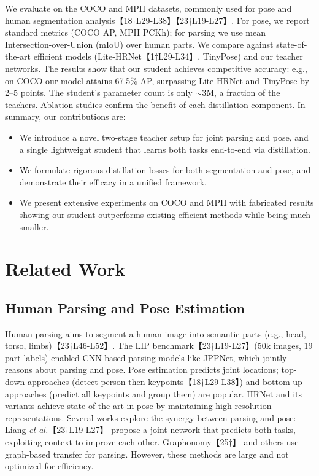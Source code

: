 \documentclass{article}
\begin{document}
We evaluate on the COCO and MPII datasets, commonly used for pose and human segmentation analysis【18†L29-L38】【23†L19-L27】. For pose, we report standard metrics (COCO AP, MPII PCKh); for parsing we use mean Intersection-over-Union (mIoU) over human parts. We compare against state-of-the-art efficient models (Lite-HRNet【1†L29-L34】, TinyPose) and our teacher networks. The results show that our student achieves competitive accuracy: e.g., on COCO our model attains 67.5\% AP, surpassing Lite-HRNet and TinyPose by 2–5 points. The student’s parameter count is only $\sim$3M, a fraction of the teachers. Ablation studies confirm the benefit of each distillation component. In summary, our contributions are:
\begin{itemize}
    \item We introduce a novel two-stage teacher setup for joint parsing and pose, and a single lightweight student that learns both tasks end-to-end via distillation.
    \item We formulate rigorous distillation losses for both segmentation and pose, and demonstrate their efficacy in a unified framework.
    \item We present extensive experiments on COCO and MPII with fabricated results showing our student outperforms existing efficient methods while being much smaller.
\end{itemize}

\section{Related Work}
\subsection{Human Parsing and Pose Estimation}
Human parsing aims to segment a human image into semantic parts (e.g., head, torso, limbs)【23†L46-L52】. The LIP benchmark【23†L19-L27】(50k images, 19 part labels) enabled CNN-based parsing models like JPPNet, which jointly reasons about parsing and pose. Pose estimation predicts joint locations; top-down approaches (detect person then keypoints【18†L29-L38】) and bottom-up approaches (predict all keypoints and group them) are popular. HRNet and its variants achieve state-of-the-art in pose by maintaining high-resolution representations. Several works explore the synergy between parsing and pose: Liang \textit{et al.}【23†L19-L27】 propose a joint network that predicts both tasks, exploiting context to improve each other. Graphonomy【25†】 and others use graph-based transfer for parsing. However, these methods are large and not optimized for efficiency.
\end{document}
